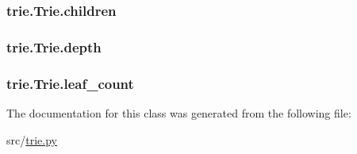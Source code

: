 \subsubsection[{\texorpdfstring{children}{children}}]{\setlength{\rightskip}{0pt plus 5cm}trie.\+Trie.\+children}\hypertarget{classtrie_1_1_trie_a1ad4feb4d215545f082dfdb48e28e25c}{}\label{classtrie_1_1_trie_a1ad4feb4d215545f082dfdb48e28e25c}
\subsubsection[{\texorpdfstring{depth}{depth}}]{\setlength{\rightskip}{0pt plus 5cm}trie.\+Trie.\+depth}\hypertarget{classtrie_1_1_trie_ae7936c113992d223e60620e6a5bf15e7}{}\label{classtrie_1_1_trie_ae7936c113992d223e60620e6a5bf15e7}
\subsubsection[{\texorpdfstring{leaf\+\_\+count}{leaf_count}}]{\setlength{\rightskip}{0pt plus 5cm}trie.\+Trie.\+leaf\+\_\+count}\hypertarget{classtrie_1_1_trie_ad2560d8eda3b7d63a0b379f26618279d}{}\label{classtrie_1_1_trie_ad2560d8eda3b7d63a0b379f26618279d}


The documentation for this class was generated from the following file\+:\begin{DoxyCompactItemize}
\item 
src/\hyperlink{trie_8py}{trie.\+py}\end{DoxyCompactItemize}
